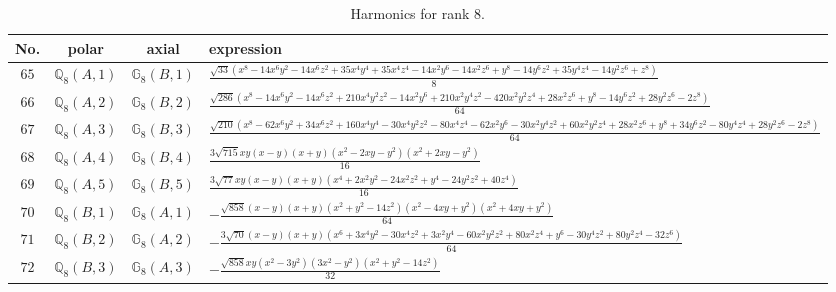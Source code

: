 \documentclass[fleqn,8pt,landscape]{jsarticle}
\begin{document}
\begin{table}[ht!]
\begin{center}
\caption{Harmonics for rank 8.}
\renewcommand{\arraystretch}{1.3}
\begin{tabular}{cccl} \hline \hline
No. & polar & axial & expression \\ \hline
$ 65 $ & $ \mathbb{Q}_{8}(A,1) $ & $ \mathbb{G}_{8}(B,1) $ & $ \frac{\sqrt{33} \left(x^{8} - 14 x^{6} y^{2} - 14 x^{6} z^{2} + 35 x^{4} y^{4} + 35 x^{4} z^{4} - 14 x^{2} y^{6} - 14 x^{2} z^{6} + y^{8} - 14 y^{6} z^{2} + 35 y^{4} z^{4} - 14 y^{2} z^{6} + z^{8}\right)}{8} $ \\
$ 66 $ & $ \mathbb{Q}_{8}(A,2) $ & $ \mathbb{G}_{8}(B,2) $ & $ \frac{\sqrt{286} \left(x^{8} - 14 x^{6} y^{2} - 14 x^{6} z^{2} + 210 x^{4} y^{2} z^{2} - 14 x^{2} y^{6} + 210 x^{2} y^{4} z^{2} - 420 x^{2} y^{2} z^{4} + 28 x^{2} z^{6} + y^{8} - 14 y^{6} z^{2} + 28 y^{2} z^{6} - 2 z^{8}\right)}{64} $ \\
$ 67 $ & $ \mathbb{Q}_{8}(A,3) $ & $ \mathbb{G}_{8}(B,3) $ & $ \frac{\sqrt{210} \left(x^{8} - 62 x^{6} y^{2} + 34 x^{6} z^{2} + 160 x^{4} y^{4} - 30 x^{4} y^{2} z^{2} - 80 x^{4} z^{4} - 62 x^{2} y^{6} - 30 x^{2} y^{4} z^{2} + 60 x^{2} y^{2} z^{4} + 28 x^{2} z^{6} + y^{8} + 34 y^{6} z^{2} - 80 y^{4} z^{4} + 28 y^{2} z^{6} - 2 z^{8}\right)}{64} $ \\
$ 68 $ & $ \mathbb{Q}_{8}(A,4) $ & $ \mathbb{G}_{8}(B,4) $ & $ \frac{3 \sqrt{715} x y \left(x - y\right) \left(x + y\right) \left(x^{2} - 2 x y - y^{2}\right) \left(x^{2} + 2 x y - y^{2}\right)}{16} $ \\
$ 69 $ & $ \mathbb{Q}_{8}(A,5) $ & $ \mathbb{G}_{8}(B,5) $ & $ \frac{3 \sqrt{77} x y \left(x - y\right) \left(x + y\right) \left(x^{4} + 2 x^{2} y^{2} - 24 x^{2} z^{2} + y^{4} - 24 y^{2} z^{2} + 40 z^{4}\right)}{16} $ \\
$ 70 $ & $ \mathbb{Q}_{8}(B,1) $ & $ \mathbb{G}_{8}(A,1) $ & $ - \frac{\sqrt{858} \left(x - y\right) \left(x + y\right) \left(x^{2} + y^{2} - 14 z^{2}\right) \left(x^{2} - 4 x y + y^{2}\right) \left(x^{2} + 4 x y + y^{2}\right)}{64} $ \\
$ 71 $ & $ \mathbb{Q}_{8}(B,2) $ & $ \mathbb{G}_{8}(A,2) $ & $ - \frac{3 \sqrt{70} \left(x - y\right) \left(x + y\right) \left(x^{6} + 3 x^{4} y^{2} - 30 x^{4} z^{2} + 3 x^{2} y^{4} - 60 x^{2} y^{2} z^{2} + 80 x^{2} z^{4} + y^{6} - 30 y^{4} z^{2} + 80 y^{2} z^{4} - 32 z^{6}\right)}{64} $ \\
$ 72 $ & $ \mathbb{Q}_{8}(B,3) $ & $ \mathbb{G}_{8}(A,3) $ & $ - \frac{\sqrt{858} x y \left(x^{2} - 3 y^{2}\right) \left(3 x^{2} - y^{2}\right) \left(x^{2} + y^{2} - 14 z^{2}\right)}{32} $ \\

\end{tabular}
\end{center}
\end{table}
\end{document}
